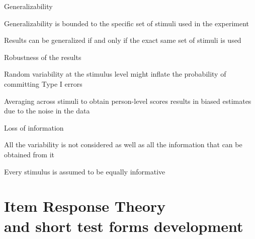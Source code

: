 \documentclass[aspectratio=149, xcolor=table]{beamer}
\begin{document}
\begin{frame}{}
	
	
	\begin{block}{Generalizability}
		
		\small
		
		Generalizability is bounded to the specific set of stimuli used in the experiment
		
		Results can be generalized if and only if the exact same set of stimuli is used 
		
		
	\end{block}
	
	
	\begin{block}{Robustness of the results}
		
		\small
		Random variability at the stimulus level might inflate the probability of committing Type I errors
		
		Averaging across stimuli to obtain person-level scores results in biased estimates due to the noise in the data
	\end{block}
	
	
	\begin{block}{Loss of information}
		
		\small
		
		All the variability is not considered as well as all the information that can be obtained from it 
		
		Every stimulus is assumed to be equally informative
	\end{block}
	
\end{frame}

\section[IRT and short test forms]{Item Response Theory \\and short test forms development}
\end{document}
